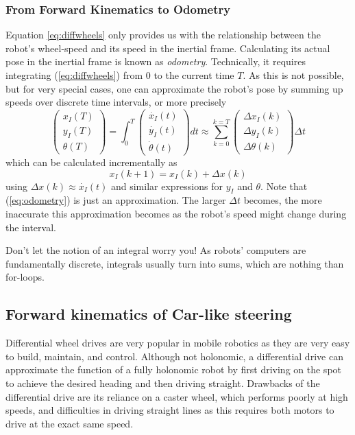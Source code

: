 \subsubsection{From Forward Kinematics to Odometry}
Equation \ref{eq:diffwheels} only provides us with the relationship between the robot's wheel-speed and its speed in the inertial frame. Calculating its actual pose in the inertial frame is known as \emph{odometry}. Technically, it requires integrating (\ref{eq:diffwheels}) from 0 to the current time $T$. As this is not possible, but for very special cases, one can approximate the robot's pose by summing up speeds over discrete time intervals, or more precisely
\begin{equation}
\left(\begin{array}{c} {x_I}(T)\\{y_I}(T)\\{\theta}(T)\end{array}\right)=
\int_0^T \left(\begin{array}{c} \dot{x_I}(t)\\\dot{y_I}(t)\\\dot{\theta}(t)\end{array}\right) dt \approx 
\sum_{k=0}^{k=T}\left(\begin{array}{c} \Delta{x_I}(k)\\\Delta{y_I}(k)\\\Delta{\theta}(k)\end{array}\right)\Delta t
\end{equation} which can be calculated incrementally as
\begin{equation}\label{eq:odometry}
x_I(k+1)=x_I(k)+\Delta x (k)
\end{equation}
using $\Delta x(k) \approx \dot{x_I}(t)$ and similar expressions for $y_I$ and $\theta$. Note that (\ref{eq:odometry}) is just an approximation. The larger $\Delta t$ becomes, the more inaccurate this approximation becomes as the robot's speed might change during the interval.   

\begin{framed}
Don't let the notion of an integral worry you! As robots' computers are fundamentally discrete, integrals usually turn into sums, which are nothing than for-loops.
\end{framed}



\subsection{Forward kinematics of Car-like steering}
Differential wheel drives are very popular in mobile robotics as they are very easy to build, maintain, and control. Although not holonomic, a differential drive can approximate the function of a fully holonomic robot by first driving on the spot to achieve the desired heading and then driving straight. Drawbacks of the differential drive are its reliance on a caster wheel, which performs poorly at high speeds, and difficulties in driving straight lines as this requires both motors to drive at the exact same speed.


